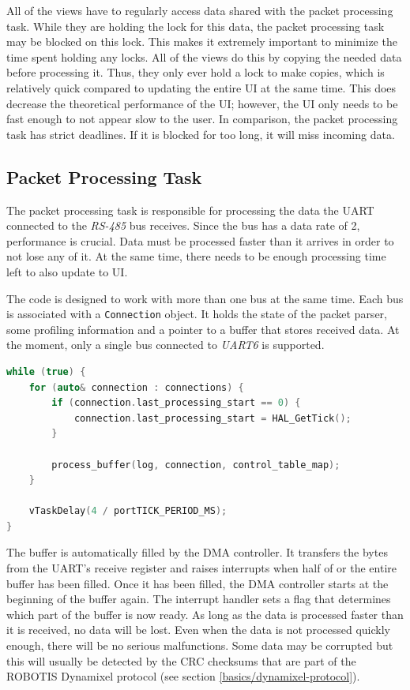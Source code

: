 All of the views have to regularly access data shared with the packet processing task. While they
are holding the lock for this data, the packet processing task may be blocked on this lock. This
makes it extremely important to minimize the time spent holding any locks. All of the views do this
by copying the needed data before processing it. Thus, they only ever hold a lock to make copies,
which is relatively quick compared to updating the entire UI at the same time. This does decrease
the theoretical performance of the UI; however, the UI only needs to be fast enough to not appear
slow to the user. In comparison, the packet processing task has strict deadlines. If it is blocked
for too long, it will miss incoming data.

\subsection{Packet Processing Task}
\label{implementation/software/packet-processing-task}

The packet processing task is responsible for processing the data the UART connected to the \textit{RS-485}
bus receives. Since the bus has a data rate of \SI{2}{}, performance is crucial. Data must be
processed faster than it arrives in order to not lose any of it. At the same time, there needs to be
enough processing time left to also update to UI.

The code is designed to work with more than one bus at the same time. Each bus is associated with
a \lstinline{Connection} object. It holds the state of the packet parser, some profiling information
and a pointer to a buffer that stores received data. At the moment, only a single bus connected to
\textit{UART6} is supported.

\begin{lstlisting}[language=C++, caption={Main loop of the packet processing task}]
while (true) {
    for (auto& connection : connections) {
        if (connection.last_processing_start == 0) {
            connection.last_processing_start = HAL_GetTick();
        }

        process_buffer(log, connection, control_table_map);
    }

    vTaskDelay(4 / portTICK_PERIOD_MS);
}
\end{lstlisting}

The buffer is automatically filled by the DMA controller. It transfers the bytes from the UART's
receive register and raises interrupts when half of or the entire buffer has been filled. Once it has
been filled, the DMA controller starts at the beginning of the buffer again. The interrupt handler
sets a flag that determines which part of the buffer is now ready. As long as the data is processed
faster than it is received, no data will be lost. Even when the data is not processed quickly enough,
there will be no serious malfunctions. Some data may be corrupted but this will usually be detected
by the CRC checksums that are part of the ROBOTIS Dynamixel protocol (see section \ref{basics/dynamixel-protocol}).

